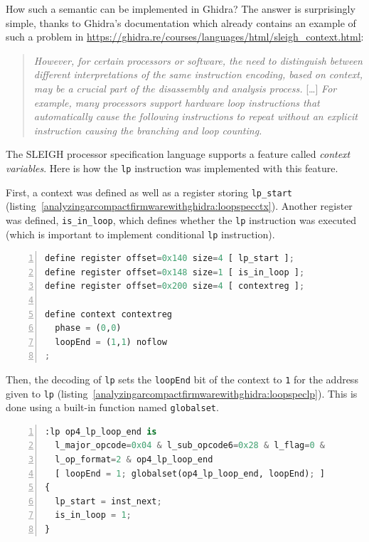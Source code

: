 How such a semantic can be implemented in Ghidra? The answer is
surprisingly simple, thanks to Ghidra's documentation which already
contains an example of such a problem in
\url{https://ghidra.re/courses/languages/html/sleigh_context.html}:

\begin{quote}
\emph{However, for certain processors or software, the need to
distinguish between different interpretations of the same instruction
encoding, based on context, may be a crucial part of the disassembly and
analysis process.} {[}\ldots{]} \emph{For example, many processors
support hardware loop instructions that automatically cause the
following instructions to repeat without an explicit instruction causing
the branching and loop counting.}
\end{quote}

The SLEIGH processor specification language supports a feature called
\emph{context variables}. Here is how the \texttt{lp}
instruction was implemented with this feature.

First, a context was defined as well as a register storing
\texttt{lp\_start}
(listing~\ref{analyzingarcompactfirmwarewithghidra:loopspecctx}). Another
register was defined, \texttt{is\_in\_loop}, which
defines whether the \texttt{lp} instruction was
executed (which is important to implement conditional
\texttt{lp} instruction).

\begin{lstlisting}[language=Python, numbers=left, caption={SLEIGH specification of the context used to implement instruction \texttt{lp}}, label=analyzingarcompactfirmwarewithghidra:loopspecctx]
define register offset=0x140 size=4 [ lp_start ];
define register offset=0x148 size=1 [ is_in_loop ];
define register offset=0x200 size=4 [ contextreg ];

define context contextreg
  phase = (0,0)
  loopEnd = (1,1) noflow
;
\end{lstlisting}

Then, the decoding of \texttt{lp} sets the
\texttt{loopEnd} bit of the context to
\texttt{1} for the address given to
\texttt{lp}
(listing~\ref{analyzingarcompactfirmwarewithghidra:loopspeclp}). This is
done using a built-in function named
\texttt{globalset}.

\begin{lstlisting}[language=Python, numbers=left, caption={SLEIGH specification of instruction \texttt{lp}}, label=analyzingarcompactfirmwarewithghidra:loopspeclp]
:lp op4_lp_loop_end is
  l_major_opcode=0x04 & l_sub_opcode6=0x28 & l_flag=0 &
  l_op_format=2 & op4_lp_loop_end
  [ loopEnd = 1; globalset(op4_lp_loop_end, loopEnd); ]
{
  lp_start = inst_next;
  is_in_loop = 1;
}
\end{lstlisting}

